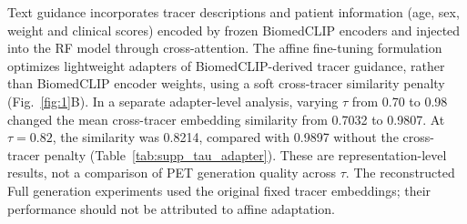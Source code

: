 Text guidance incorporates tracer descriptions and patient information (age, sex, weight and clinical scores) encoded by frozen BiomedCLIP encoders and injected into the RF model through cross-attention. The affine fine-tuning formulation optimizes lightweight adapters of BiomedCLIP-derived tracer guidance, rather than BiomedCLIP encoder weights, using a soft cross-tracer similarity penalty (Fig.~\ref{fig:1}B). In a separate adapter-level analysis, varying $\tau$ from 0.70 to 0.98 changed the mean cross-tracer embedding similarity from 0.7032 to 0.9807. At $\tau=0.82$, the similarity was 0.8214, compared with 0.9897 without the cross-tracer penalty (Table~\ref{tab:supp_tau_adapter}). These are representation-level results, not a comparison of PET generation quality across $\tau$. The reconstructed Full generation experiments used the original fixed tracer embeddings; their performance should not be attributed to affine adaptation.
